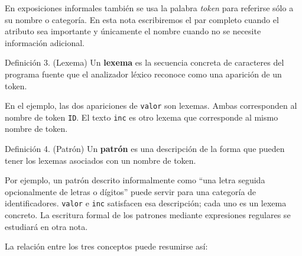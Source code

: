 \documentclass[11pt,spanish]{article}
\begin{document}
En exposiciones informales también se usa la palabra \emph{token} para referirse sólo a su nombre o categoría. En esta nota escribiremos el par completo cuando el atributo sea importante y únicamente el nombre cuando no se necesite información adicional.

\begin{definicion}{Definición 3. (Lexema)}
Un \textbf{lexema} es la secuencia concreta de caracteres del programa fuente que el analizador léxico reconoce como una aparición de un token.
\end{definicion}

En el ejemplo, las dos apariciones de \texttt{valor} son lexemas. Ambas corresponden al nombre de token \texttt{ID}. El texto \texttt{inc} es otro lexema que corresponde al mismo nombre de token.

\begin{definicion}{Definición 4. (Patrón)}
Un \textbf{patrón} es una descripción de la forma que pueden tener los lexemas asociados con un nombre de token.
\end{definicion}

Por ejemplo, un patrón descrito informalmente como ``una letra seguida opcionalmente de letras o dígitos'' puede servir para una categoría de identificadores. \texttt{valor} e \texttt{inc} satisfacen esa descripción; cada uno es un lexema concreto. La escritura formal de los patrones mediante expresiones regulares se estudiará en otra nota.

La relación entre los tres conceptos puede resumirse así:

\begin{center}
\end{center}
\end{document}

